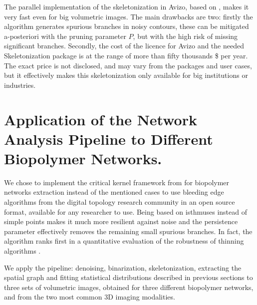 
The parallel implementation of the skeletonization in Avizo, based on \cite{fouard_skeletonization_2004}, makes it very fast even for big volumetric images.
The main drawbacks are two: firstly the algorithm generates spurious branches in noisy contours,
these can be mitigated a-posteriori with the pruning parameter $P$, but with the high risk of missing significant branches.
Secondly, the cost of the licence for Avizo and the needed Skeletonization package is at the range of more than fifty thousands \$ per year. The exact price is not disclosed, and may vary from the packages and user cases, but it effectively makes this skeletonization only available for big institutions or industries.

\section{Application of the Network Analysis Pipeline to Different Biopolymer Networks.}%
\label{sec:sg_results}


We chose to implement the critical kernel framework from \citep{bertrand_powerful_2014} for biopolymer networks extraction instead of the mentioned cases to use bleeding edge algorithms from the digital topology research community in an open source format, available for any researcher to use. Being based on isthmuses instead of simple points makes it much more resilient against noise and the persistence parameter effectively removes the remaining small spurious branches. In fact, the algorithm ranks first in a quantitative evaluation of the robustness of thinning algorithms \cite{bertrand_powerful_2014, couprie_3d_2015}.

We apply the pipeline: denoising, binarization, skeletonization, extracting the spatial graph and fitting statistical distributions described in previous sections to three sets of volumetric images, obtained for three different biopolymer networks, and from the two most common 3D imaging modalities.

